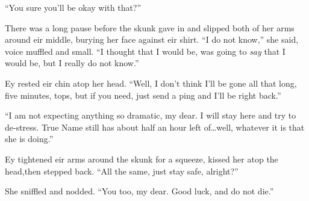 ``You sure you'll be okay with that?''

There was a long pause before the skunk gave in and slipped both of her arms around eir middle, burying her face against eir shirt. ``I do not know,'' she said, voice muffled and small. ``I thought that I would be, was going to \emph{say} that I would be, but I really do not know.''

Ey rested eir chin atop her head. ``Well, I don't think I'll be gone all that long, five minutes, tops, but if you need, just send a ping and I'll be right back.''

``I am not expecting anything so dramatic, my dear. I will stay here and try to de-stress. True Name still has about half an hour left of\ldots well, whatever it is that she is doing.''

Ey tightened eir arms around the skunk for a squeeze, kissed her atop the head,then stepped back. ``All the same, just stay safe, alright?''

She sniffled and nodded. ``You too, my dear. Good luck, and do not die.''
